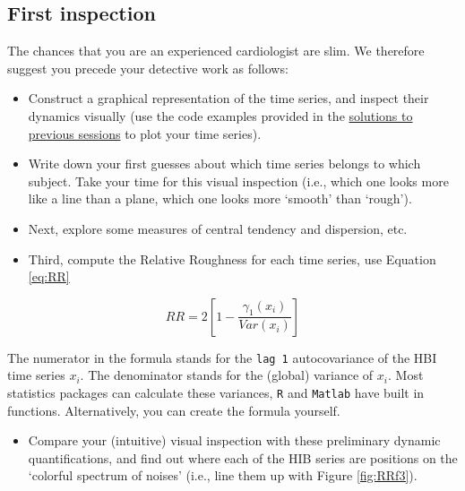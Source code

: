 \documentclass[]{book}
\providecommand{\tightlist}{%
  \setlength{\itemsep}{0pt}\setlength{\parskip}{0pt}}
\begin{document}
\subsection{First inspection}\label{first-inspection}

The chances that you are an experienced cardiologist are slim. We
therefore suggest you precede your detective work as follows:

\begin{itemize}
\tightlist
\item
  Construct a graphical representation of the time series, and inspect
  their dynamics visually (use the code examples provided in the
  \protect\hyperlink{moc1Rsol}{solutions to previous sessions} to plot
  your time series).
\item
  Write down your first guesses about which time series belongs to which
  subject. Take your time for this visual inspection (i.e., which one
  looks more like a line than a plane, which one looks more `smooth'
  than `rough').
\item
  Next, explore some measures of central tendency and dispersion, etc.
\item
  Third, compute the Relative Roughness for each time series, use
  Equation \eqref{eq:RR}
\end{itemize}

\begin{equation}
RR = 2\left[1−\frac{\gamma_1(x_i)}{Var(x_i)}\right]
\label{eq:RR}
\end{equation}

The numerator in the formula stands for the \texttt{lag\ 1}
autocovariance of the HBI time series \(x_i\). The denominator stands
for the (global) variance of \(x_i\). Most statistics packages can
calculate these variances, \texttt{R} and \texttt{Matlab} have built in
functions. Alternatively, you can create the formula yourself.

\begin{itemize}
\tightlist
\item
  Compare your (intuitive) visual inspection with these preliminary
  dynamic quantifications, and find out where each of the HIB series are
  positions on the `colorful spectrum of noises' (i.e., line them up
  with Figure \ref{fig:RRf3}).
\end{itemize}
\end{document}
